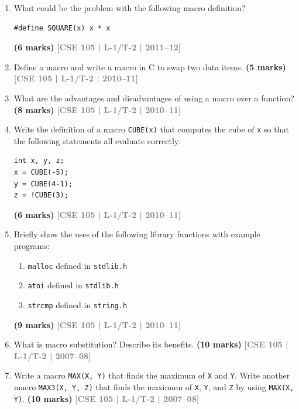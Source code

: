 \documentclass[12pt,a3paper]{article}
\newcommand{\yr}[1]{\hfill\textcolor{gray}{\small\textbf{[#1]}}}
\newcommand{\mk}[1]{\textcolor{orange!70!black}{\small\textbf{(#1 marks)}}}
\begin{document}
\begin{enumerate}
\begin{lstlisting}
printf("x1 = %f\n", x1);
printf("x2 = %f\n", x2);
/* ... */
printf("x10 = %f\n", x10);
\end{lstlisting}
\mk{5} \yr{CSE 105 | L-1/T-2 | 2012--13}

\item What could be the problem with the following macro definition?
 
\begin{lstlisting}
#define SQUARE(x) x * x
\end{lstlisting}
\mk{6} \yr{CSE 105 | L-1/T-2 | 2011--12}

\item Define a macro and write a macro in C to swap two data items.
\mk{5} \yr{CSE 105 | L-1/T-2 | 2010--11}

\item What are the advantages and disadvantages of using a macro over a function?
\mk{8} \yr{CSE 105 | L-1/T-2 | 2010--11}

\item Write the definition of a macro \texttt{CUBE(x)} that computes the cube of \texttt{x} so that the following statements all evaluate correctly:
\begin{lstlisting}
int x, y, z;
x = CUBE(-5);
y = CUBE(4-1);
z = !CUBE(3);
\end{lstlisting}
 
\mk{6} \yr{CSE 105 | L-1/T-2 | 2010--11}

\item Briefly show the uses of the following library functions with example programs:
\begin{enumerate}
  \item \texttt{malloc} defined in \texttt{stdlib.h}
  \item \texttt{atoi} defined in \texttt{stdlib.h}
  \item \texttt{strcmp} defined in \texttt{string.h}
\end{enumerate}
\mk{9} \yr{CSE 105 | L-1/T-2 | 2010--11}

\item What is macro substitution? Describe its benefits.
\mk{10} \yr{CSE 105 | L-1/T-2 | 2007--08}

\item Write a macro \texttt{MAX(X, Y)} that finds the maximum of \texttt{X} and \texttt{Y}. Write another macro \texttt{MAX3(X, Y, Z)} that finds the maximum of \texttt{X}, \texttt{Y}, and \texttt{Z} by using \texttt{MAX(X, Y)}.
\mk{10} \yr{CSE 105 | L-1/T-2 | 2007--08}


\end{enumerate}
\end{document}
